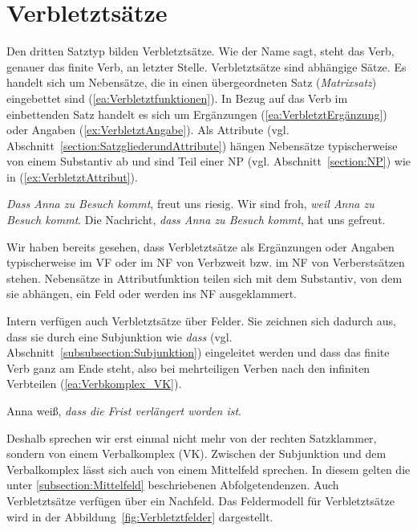 \section{Verbletztsätze}\label{section:Verbletztsatz}

Den dritten Satztyp bilden Verbletztsätze. Wie der Name sagt, steht das Verb, genauer das finite Verb, an letzter Stelle. Verbletztsätze sind abhängige Sätze. Es handelt sich um Nebensätze, die in einen übergeordneten Satz (\textit{Matrixsatz}) eingebettet sind (\ref{ea:Verbletztfunktionen}). In Bezug auf das Verb im einbettenden Satz handelt es sich um Ergänzungen (\ref{ea:VerbletztErgänzung}) oder Angaben (\ref{ex:VerbletztAngabe}). Als Attribute (vgl. Abschnitt~\ref{section:SatzgliederundAttribute}) hängen Nebensätze typischerweise von einem Substantiv ab und sind Teil einer NP (vgl. Abschnitt~\ref{section:NP}) wie in  (\ref{ex:VerbletztAttribut}). 

\ea \label{ea:Verbletztfunktionen}
\ea \label{ea:VerbletztErgänzung} \textit{Dass Anna zu Besuch kommt}, freut uns riesig.
\ex \label{ex:VerbletztAngabe} Wir sind froh, \textit{weil Anna zu Besuch kommt}.
\ex \label{ex:VerbletztAttribut} Die Nachricht, \textit{dass Anna zu Besuch kommt}, hat uns gefreut. 
\z 
\z 

Wir haben bereits gesehen, dass Verbletztsätze als Ergänzungen oder Angaben typischerweise im VF oder im NF von Verbzweit bzw. im NF von Verberstsätzen stehen. Nebensätze in Attributfunktion teilen sich mit dem Substantiv, von dem sie abhängen, ein Feld oder werden ins NF ausgeklammert. 

Intern verfügen auch Verbletztsätze über Felder. Sie zeichnen sich dadurch aus, dass sie durch eine Subjunktion wie \textit{dass} (vgl. Abschnitt~\ref{subsubsection:Subjunktion}) eingeleitet werden und dass das finite Verb ganz am Ende steht, also bei mehrteiligen Verben nach den infiniten Verbteilen (\ref{ea:Verbkomplex_VK}).

\ea \label{ea:Verbkomplex_VK} Anna weiß, \textit{dass die Frist verlängert worden ist}.
\z 

Deshalb sprechen wir erst einmal nicht mehr von der rechten Satzklammer, sondern von einem Verbalkomplex (VK). Zwischen der Subjunktion und dem Verbalkomplex lässt sich auch von einem Mittelfeld sprechen. In diesem gelten die unter \ref{subsection:Mittelfeld} beschriebenen Abfolgetendenzen. Auch Verbletztsätze verfügen über ein Nachfeld. Das Feldermodell für Verbletztsätze wird in der Abbildung~\ref{fig:Verbletztfelder} dargestellt.

